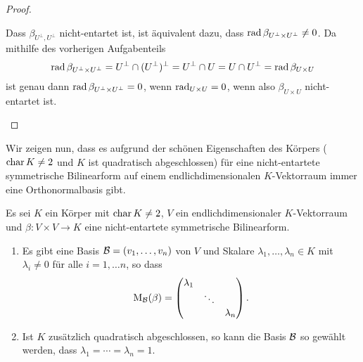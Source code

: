 \documentclass[a4paper,10pt,numbers=noenddot]{scrartcl}
\begin{document}
\begin{proof}
\begin{enumerate}[leftmargin=*]
      Dass $\beta_{U^\perp, U^\perp}$ nicht-entartet ist, ist äquivalent dazu, dass $\operatorname{rad} \beta_{U^\perp \times U^\perp} \neq 0$.
      Da mithilfe des vorherigen Aufgabenteils
      \[
          \operatorname{rad} \beta_{U^\perp \times U^\perp}
        = U^\perp \cap (U^\perp)^\perp
        = U^\perp \cap U
        = U \cap U^\perp
        = \operatorname{rad} \beta_{U \times U}
      \]
      ist genau dann $\operatorname{rad} \beta_{U^\perp \times U^\perp} = 0$, wenn $\operatorname{rad}_{U \times U} = 0$, wenn also $\beta_{U \times U}$ nicht-entartet ist.
    \qedhere
  \end{enumerate}
\end{proof}


Wir zeigen nun, dass es aufgrund der schönen Eigenschaften des Körpers ($\operatorname{char} K \neq 2$ und $K$ ist quadratisch abgeschlossen) für eine nicht-entartete symmetrische Bilinearform auf einem endlichdimensionalen $K$-Vektorraum immer eine Orthonormalbasis gibt.


\begin{theorem}\label{thrm: existence of orthonormalbases}
  Es sei $K$ ein Körper mit $\operatorname{char} K \neq 2$, $V$ ein endlichdimensionaler $K$-Vektorraum und $\beta \colon V \times V \to K$ eine nicht-entartete symmetrische Bilinearform.
  \begin{enumerate}[leftmargin=*]
    \item
      Es gibt eine Basis $\mathcal{B} = (v_1, \dotsc, v_n)$ von $V$ und Skalare $\lambda_1, \dotsc, \lambda_n \in K$ mit $\lambda_i \neq 0$ für alle $i = 1, \dotsc n$, so dass
      \[
        \operatorname{M}_{\mathcal{B}}(\beta)
        =
        \begin{pmatrix}
          \lambda_1 &         &             \\
                    & \ddots  &             \\
                    &         & \lambda_n
        \end{pmatrix}.
      \]
    \item
      Ist $K$ zusätzlich quadratisch abgeschlossen, so kann die Basis $\mathcal{B}$ so gewählt werden, dass $\lambda_1 = \dotsb = \lambda_n = 1$.
  \end{enumerate}
\end{theorem}
\end{document}
